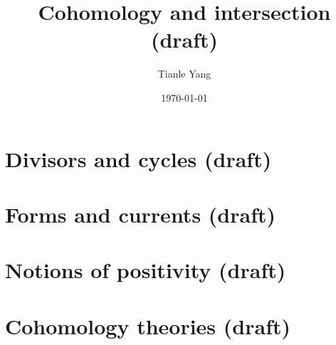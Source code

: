 \documentclass[sectionlevel=chapter]{noteformyself}
\title{Cohomology and intersection (draft)}
\author{Tianle Yang}
\date{\today}
\begin{document}

    \tableofcontents

    \section{Divisors and cycles (draft)}
    
    \section{Forms and currents (draft)}
    
    \section{Notions of positivity (draft)}
    
    \section{Cohomology theories (draft)}
    

    \printbibliography[heading=bibintoc, title={References}]
\end{document}
